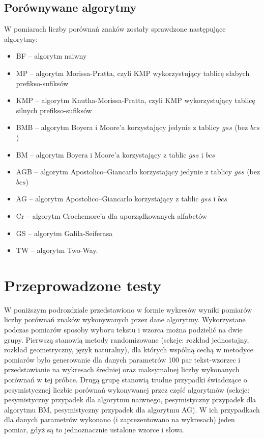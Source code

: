 \subsection{Porównywane algorytmy}
W pomiarach liczby porównań znaków zostały sprawdzone następujące algorytmy:
\begin{itemize}
  \item BF -- algorytm naiwny
  \item MP -- algorytm Morissa-Pratta, czyli KMP wykorzystujący tablicę słabych prefikso-sufiksów
  \item KMP -- algorytm Knutha-Morissa-Pratta, czyli KMP wykorzystujący tablicę silnych prefikso-sufiksów
  \item BMB -- algorytm Boyera i Moore’a korzystający jedynie z tablicy $gss$ (bez $bcs$)
  \item BM -- algorytm Boyera i Moore’a korzystający z tablic $gss$ i $bcs$
  \item AGB -- algorytm Apostolico–Giancarlo korzystający jedynie z tablicy $gss$ (bez $bcs$)
  \item AG -- algorytm Apostolico–Giancarlo korzystający z tablic $gss$ i $bcs$
  \item Cr -- algorytm Crochemore'a dla uporządkowanych alfabetów
  \item GS -- algorytm Galila-Seiferasa
  \item TW -- algorytm Two-Way.
\end{itemize}

\section{Przeprowadzone testy}
W poniższym podrozdziale przedstawiono w formie wykresów wyniki pomiarów liczby porównań znaków wykonywanych przez dane algorytmy. Wykorzystane podczas pomiarów sposoby wyboru tekstu i wzorca można podzielić na dwie grupy. Pierwszą stanowią metody randomizowane (sekcje: rozkład jednostajny, rozkład geometryczny, język naturalny), dla których wspólną cechą w metodyce pomiarów było generowanie dla danych parametrów 100 par tekst-wzorzec i przedstawianie na wykresach średniej oraz maksymalnej liczby wykonanych porównań w tej próbce. Drugą grupę stanowią trudne przypadki świadczące o pesymistycznej liczbie porównań wykonywanej przez część algorytmów (sekcje: pesymistyczny przypadek dla algorytmu naiwnego, pesymistyczny przypadek dla algorytmu BM, pesymistyczny przypadek dla algorytmu AG). W ich przypadkach dla danych parametrów wykonano (i zaprezentowano na wykresach) jeden pomiar, gdyż są to jednoznacznie ustalone wzorce i słowa.

